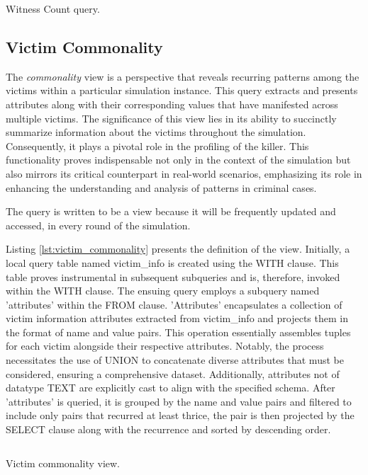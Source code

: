 \documentclass{article}
\begin{document}
\begin{listing}[H]
\inputminted[breaklines=true]{sql}{witness_count.sql}
\caption{Witness Count query.}
    \label{lst:witness_count}
\end{listing}

\subsection{Victim Commonality}
The \textit{commonality} view is a perspective that reveals recurring patterns among the victims within a particular simulation instance. This query extracts and presents attributes along with their corresponding values that have manifested across multiple victims. The significance of this view lies in its ability to succinctly summarize information about the victims throughout the simulation. Consequently, it plays a pivotal role in the profiling of the killer. This functionality proves indispensable not only in the context of the simulation but also mirrors its critical counterpart in real-world scenarios, emphasizing its role in enhancing the understanding and analysis of patterns in criminal cases.

The query is written to be a view because it will be frequently updated and accessed, in every round of the simulation.

Listing \ref{lst:victim_commonality} presents the definition of the view. Initially, a local query table named victim\_info is created using the WITH clause. This table proves instrumental in subsequent subqueries and is, therefore, invoked within the WITH clause. The ensuing query employs a subquery named 'attributes' within the FROM clause. 'Attributes' encapsulates a collection of victim information attributes extracted from victim\_info and projects them in the format of name and value pairs. This operation essentially assembles tuples for each victim alongside their respective attributes. Notably, the process necessitates the use of UNION to concatenate diverse attributes that must be considered, ensuring a comprehensive dataset. Additionally, attributes not of datatype TEXT are explicitly cast to align with the specified schema. After 'attributes' is queried, it is grouped by the name and value pairs and filtered to include only pairs that recurred at least thrice, the pair is then projected by the SELECT clause along with the recurrence and sorted by descending order.

\begin{listing}[H]
    \inputminted[breaklines=true]{sql}{victim_common_attribute.sql}
    \caption{Victim commonality view.}
    \label{lst:victim_commonality}
\end{listing}
\end{document}
